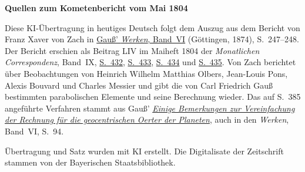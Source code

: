 \clearpage\thispagestyle{empty}
\begin{center}\textbf{Quellen zum Kometenbericht vom Mai 1804}\end{center}
\noindent Diese KI-Übertragung in heutiges Deutsch folgt dem Auszug aus dem Bericht von Franz Xaver von Zach in \href{https://gdz.sub.uni-goettingen.de/id/PPN236007467}{Gauß’ \textit{Werken}, Band~VI} (Göttingen, 1874), S.~247--248. Der Bericht erschien als Beitrag LIV im Maiheft 1804 der \textit{Monatlichen Correspondenz}, Band~IX, \href{https://www.digitale-sammlungen.de/en/view/bsb10538601?page=468}{S.~432}, \href{https://www.digitale-sammlungen.de/en/view/bsb10538601?page=469}{S.~433}, \href{https://www.digitale-sammlungen.de/en/view/bsb10538601?page=470}{S.~434} und \href{https://www.digitale-sammlungen.de/en/view/bsb10538601?page=471}{S.~435}. Von Zach berichtet über Beobachtungen von Heinrich Wilhelm Matthias Olbers, Jean-Louis Pons, Alexis Bouvard und Charles Messier und gibt die von Carl Friedrich Gauß bestimmten parabolischen Elemente und seine Berechnung wieder. Das auf S.~385 angeführte Verfahren stammt aus Gauß’ \href{https://www.digitale-sammlungen.de/en/view/bsb10538601?page=421}{\textit{Einige Bemerkungen zur Vereinfachung der Rechnung für die geocentrischen Oerter der Planeten}}, auch in den \textit{Werken}, Band~VI, S.~94.
\par\smallskip\noindent Übertragung und Satz wurden mit KI erstellt. Die Digitalisate der Zeitschrift stammen von der Bayerischen Staatsbibliothek.
\clearpage
